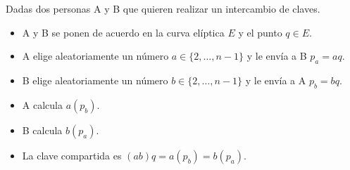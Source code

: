Dadas dos personas A y B que quieren realizar un intercambio de claves.
\begin{itemize}
	\item A y B se ponen de acuerdo en la curva elíptica $E$ y el punto $q\in E$.
	\item A elige aleatoriamente un número $a\in\{2,\dots,n-1\}$ y le envía a B $p_a=aq$.
	\item B elige aleatoriamente un número $b\in\{2,\dots,n-1\}$ y le envía a A $p_b=bq$.
	\item A calcula $a(p_b)$.
	\item B calcula $b(p_a)$.
	\item La clave compartida es $(ab)q=a(p_b)=b(p_a)$.
\end{itemize}

